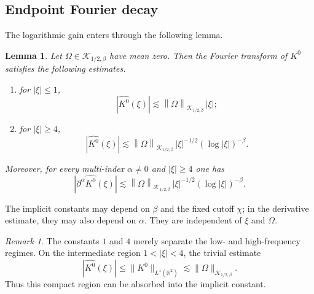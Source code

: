 \documentclass[11pt]{amsart}
\newtheorem{lemma}[definition]{Lemma}
\theoremstyle{remark}
\newtheorem{remark}[definition]{Remark}
\numberwithin{equation}{section}
\newcommand{\cK}{\mathcal K}
\newcommand{\norm}[1]{\left\lVert #1\right\rVert}
\newcommand{\abs}[1]{\left\lvert #1\right\rvert}
\newcommand{\p}{\partial}
\begin{document}
	\subsection{Endpoint Fourier decay}
	
	The logarithmic gain enters through the following lemma.
	
	\begin{lemma}\label{lem:prototype-fourier}
		Let \(\Omega\in\cK_{1/2,\beta}\) have mean zero. Then the Fourier
		transform of \(K^0\) satisfies the following estimates.
		\begin{enumerate}
			\item for \(\abs{\xi}\le 1\),
			\begin{equation}\label{eq:K0-low}
				\abs{\widehat{K^0}(\xi)}\lesssim \norm{\Omega}_{\cK_{1/2,\beta}}\,\abs{\xi};
			\end{equation}
			\item for \(\abs{\xi}\ge 4\),
			\begin{equation}\label{eq:K0-high}
				\abs{\widehat{K^0}(\xi)}\lesssim \norm{\Omega}_{\cK_{1/2,\beta}}\,\abs{\xi}^{-1/2}(\log\abs{\xi})^{-\beta}.
			\end{equation}
		\end{enumerate}
		Moreover, for every multi-index \(\alpha\neq 0\) and \(\abs{\xi}\ge 4\) one has
		\begin{equation}\label{eq:K0-deriv-high}
			\abs{\p^\alpha\widehat{K^0}(\xi)}
			\lesssim
			\norm{\Omega}_{\cK_{1/2,\beta}}\,\abs{\xi}^{-1/2}(\log\abs{\xi})^{-\beta}.
		\end{equation}
	\end{lemma}
	
	The implicit constants may depend on \(\beta\) and the fixed cutoff
	\(\chi\); in the derivative estimate, they may also depend on \(\alpha\).
	They are independent of \(\xi\) and \(\Omega\).
	
	\begin{remark}
		The constants \(1\) and \(4\) merely separate the low- and high-frequency
		regimes.
		On the intermediate region \(1<|\xi|<4\), the trivial estimate
		\[
		|\widehat{K^0}(\xi)|\le \|K^0\|_{L^1(\mathbb R^2)}
		\lesssim \|\Omega\|_{\cK_{1/2,\beta}}.
		\]
		Thus this compact region can be absorbed into the implicit constant.
	\end{remark}
	
\end{document}
